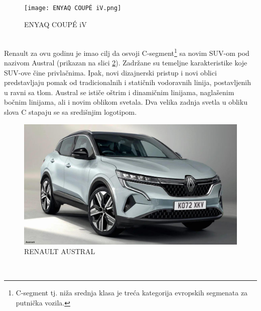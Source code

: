 \documentclass[a4paper]{article}
\begin{document}
\begin{figure}[h]
        \centering
        \texttt{[image: ENYAQ COUPÉ iV.png]}
        \caption{ENYAQ COUPÉ iV}
        \label{fig:IMG_Enyaq}
\end{figure}

\newpage

\\

    Renault za ovu godinu je imao cilj da osvoji C-segment\footnote{C-segment tj. niža srednja klasa je treća kategorija evropskih segmenata za putnička vozila.} sa novim SUV-om pod nazivom Austral (prikazan na slici \ref{fig:IMG_Austral}). Zadržane su temeljne karakteristike koje SUV-ove čine privlačnima. Ipak, novi dizajnerski pristup i novi oblici predstavljaju pomak od tradicionalnih i statičnih vodoravnih linija, postavljenih u ravni sa tlom. Austral se ističe oštrim i dinamičnim linijama, naglašenim bočnim linijama, ali i novim oblikom svetala. Dva velika zadnja svetla u obliku slova C stapaju se sa središnjim logotipom.\\  

\begin{figure}[h]
        \centering
        \includegraphics[width=\linewidth]{Austral.jpg}
        \caption{RENAULT AUSTRAL}
        \label{fig:IMG_Austral}
        \end{figure}

\newpage

\\
\end{document}
